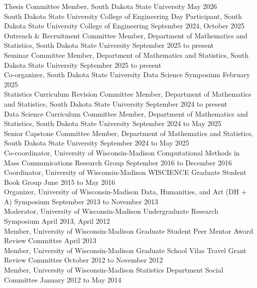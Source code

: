 \documentclass[
  10pt,
]
{article}
\begin{document}
\normalsize Thesis Committee Member, South Dakota State University
\hfill May 2026\\
\normalsize South Dakota State University College of Engineering Day
Participant, South Dakota State University College of Engineering
\hfill September 2024, October 2025\\
\normalsize Outreach \& Recruitment Committee Member, Department of
Mathematics and Statistics, South Dakota State University
\hfill September 2025 to present\\
\normalsize Seminar Committee Member, Department of Mathematics and
Statistics, South Dakota State University \hfill September 2025 to
present\\
\normalsize Co-organizer, South Dakota State University Data Science
Symposium \hfill February 2025\\
\normalsize Statistics Curriculum Revision Committee Member, Department
of Mathematics and Statistics, South Dakota State University
\hfill September 2024 to present\\
\normalsize Data Science Curriculum Committee Member, Department of
Mathematics and Statistics, South Dakota State University
\hfill September 2024 to May 2025\\
\normalsize Senior Capstone Committee Member, Department of Mathematics
and Statistics, South Dakota State University \hfill September 2024 to
May 2025\\
\normalsize Co-coordinator, University of Wisconsin-Madison
Computational Methods in Mass Communications Research Group
\hfill September 2016 to December 2016\\
\normalsize Coordinator, University of Wisconsin-Madison WISCIENCE
Graduate Student Book Group \hfill June 2015 to May 2016\\
\normalsize Organizer, University of Wisconsin-Madison Data, Humanities,
and Art (DH + A) Symposium \hfill September 2013 to November 2013\\
\normalsize Moderator, University of Wisconsin-Madison Undergraduate
Research Symposium \hfill April 2013, April 2012\\
\normalsize Member, University of Wisconsin-Madison Graduate Student
Peer Mentor Award Review Committee \hfill April 2013\\
\normalsize Member, University of Wisconsin-Madison Graduate School
Vilas Travel Grant Review Committee \hfill October 2012 to November
2012\\
\normalsize Member, University of Wisconsin-Madison Statistics
Department Social Committee \hfill January 2012 to May 2014
\end{document}
